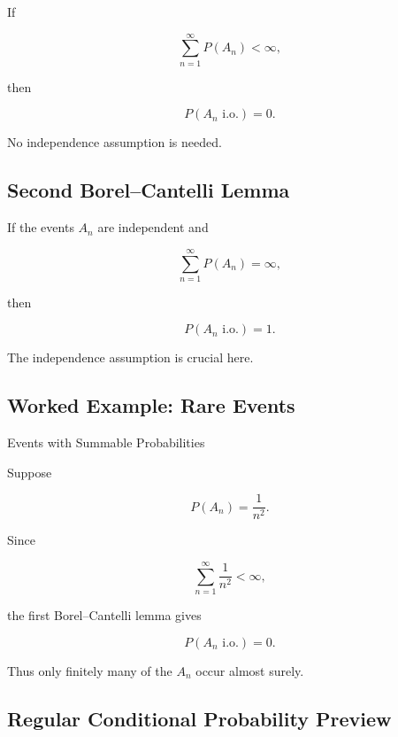If

\[
\sum_{n=1}^{\infty}
P(A_n)
<
\infty,
\]

then

\[
\boxed{
P(A_n\text{ i.o.})=0.
}
\]

No independence assumption is needed.

\subsection{Second Borel--Cantelli Lemma}
\label{subsec:second-borel-cantelli-measure}

If the events \(A_n\) are independent and

\[
\sum_{n=1}^{\infty}
P(A_n)
=
\infty,
\]

then

\[
\boxed{
P(A_n\text{ i.o.})=1.
}
\]

The independence assumption is crucial here.

\subsection{Worked Example: Rare Events}
\label{subsec:worked-borel-cantelli}

\begin{workedexamplebox}{Events with Summable Probabilities}

Suppose

\[
P(A_n)
=
\frac1{n^2}.
\]

Since

\[
\sum_{n=1}^{\infty}
\frac1{n^2}
<
\infty,
\]

the first Borel--Cantelli lemma gives

\begin{answerbox}
\[
\boxed{
P(A_n\text{ i.o.})=0.
}
\]
\end{answerbox}

Thus only finitely many of the \(A_n\) occur almost surely.

\end{workedexamplebox}

\subsection{Regular Conditional Probability Preview}
\label{subsec:regular-conditional-probability}

